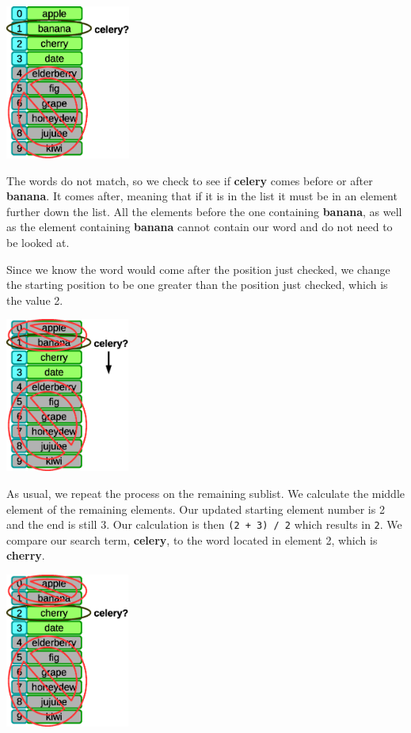 \beforefig
\centerline{\includegraphics[height=2in]{figs2/recursion-binsearch-failure-3.eps}}
\afterfig

The words do not match, so we check to see if \textbf{celery} comes before or after \textbf{banana}. It comes after, meaning that if it is in the list it must be in an element further down the list. All the elements before the one containing \textbf{banana}, as well as the element containing \textbf{banana} cannot contain our word and do not need to be looked at.

Since we know the word would come after the position just checked, we change the starting position to be one greater than the position just checked, which is the value 2.

\beforefig
\centerline{\includegraphics[height=2in]{figs2/recursion-binsearch-failure-4.eps}}
\afterfig

As usual, we repeat the process on the remaining sublist. We calculate the middle element of the remaining elements. Our updated starting element number is 2 and the end is still 3. Our calculation is then \texttt{(2 + 3) / 2} which results in \texttt{2}. We compare our search term, \textbf{celery}, to the word located in element 2, which is \textbf{cherry}.

\beforefig
\centerline{\includegraphics[height=2in]{figs2/recursion-binsearch-failure-5.eps}}
\afterfig

